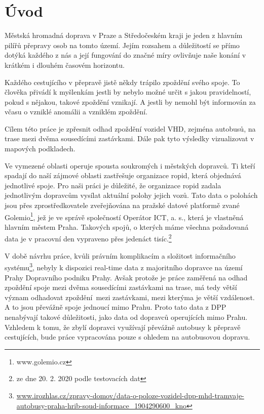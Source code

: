 \chapter*{Úvod}

Městská hromadná doprava v Praze a Středočeském kraji je jeden z hlavním pilířů přepravy osob na tomto území. Jejím rozsahem a důležitostí se přímo dotýká každého z nás a její fungování do značné míry ovlivňuje naše konání v krátkém i dlouhém časovém horizontu.

\bigbreak

Každého cestujícího v přepravě jistě někdy trápilo zpoždění svého spoje. To člověka přivádí k myšlenkám jestli by nebylo možné určit s jakou pravidelností, pokud s nějakou, takové zpoždění vznikají. A jestli by nemohl být informován za včasu o vzniklé anomálii a vzniklém zpoždění.

\bigbreak

Cílem této práce je zpřesnit odhad zpoždění vozidel VHD, zejména autobusů, na trase mezi dvěma sousedícími zastávkami. Dále pak tyto výsledky vizualizovat v mapových podkladech.

\bigbreak

Ve vymezené oblasti operuje spousta soukromých i městských dopravců. Ti kteří spadají do naší zájmové oblasti zastřešuje organizace \gls{ropid}, která objednává jednotlivé spoje. Pro naši práci je důležité, že organizace \gls{ropid} zadala jednotlivým dopravcům vysílat aktuální polohy jejich vozů. Tato data o polohách jsou přes zprostředkovatele zveřejňována na pražské datové platformě zvané Golemio\footnote{www.golemio.cz}, jež je ve správě společností Operátor ICT, a. s., která je vlastněná hlavním městem Praha.
Takových spojů, o kterých máme všechna požadovaná data je v pracovní den vypraveno přes jedenáct tisíc.\footnote{ze dne 20. 2. 2020 podle testovacích dat}

\bigbreak

V době návrhu práce, kvůli právním komplikacím a složitost informačního systému\footnote{\url{www.irozhlas.cz/zpravy-domov/data-o-poloze-vozidel-dpp-mhd-tramvaje-autobusy-praha-hrib-soud-informace_1904290600_kno}}, nebyly k dispozici real-time data z majoritního dopravce na území Prahy Dopravního podniku Prahy. Avšak protože je práce zaměřená na odhad zpoždění spoje mezi dvěma sousedícími zastávkami na trase, má tedy větší význam odhadovat zpoždění mezi zastávkami, mezi kterýma je větší vzdálenost. A to jsou převážně spoje jednoucí mimo Prahu. Proto tato data z DPP nenabývají takové důležitosti, jako data od dopravců operujících mimo Prahu. Vzhledem k tomu, že zbylí dopravci využívají převážně autobusy k přepravě cestujících, bude práce vypracována pouze s ohledem na autobusovou dopravu.

